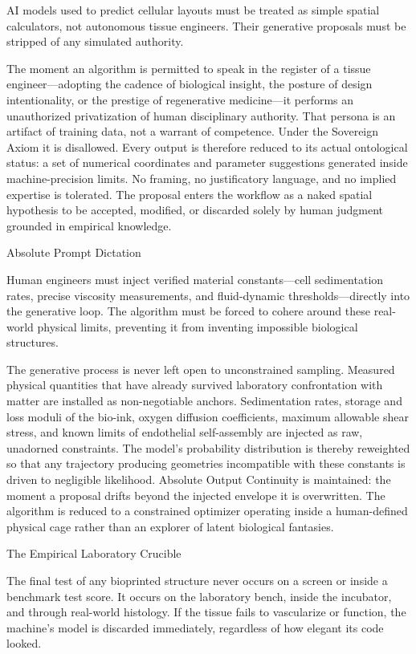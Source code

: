 AI models used to predict cellular layouts must be treated as simple spatial calculators, not autonomous tissue engineers. Their generative proposals must be stripped of any simulated authority.

The moment an algorithm is permitted to speak in the register of a tissue engineer—adopting the cadence of biological insight, the posture of design intentionality, or the prestige of regenerative medicine—it performs an unauthorized privatization of human disciplinary authority. That persona is an artifact of training data, not a warrant of competence. Under the Sovereign Axiom it is disallowed. Every output is therefore reduced to its actual ontological status: a set of numerical coordinates and parameter suggestions generated inside machine-precision limits. No framing, no justificatory language, and no implied expertise is tolerated. The proposal enters the workflow as a naked spatial hypothesis to be accepted, modified, or discarded solely by human judgment grounded in empirical knowledge.

Absolute Prompt Dictation

Human engineers must inject verified material constants—cell sedimentation rates, precise viscosity measurements, and fluid-dynamic thresholds—directly into the generative loop. The algorithm must be forced to cohere around these real-world physical limits, preventing it from inventing impossible biological structures.

The generative process is never left open to unconstrained sampling. Measured physical quantities that have already survived laboratory confrontation with matter are installed as non-negotiable anchors. Sedimentation rates, storage and loss moduli of the bio-ink, oxygen diffusion coefficients, maximum allowable shear stress, and known limits of endothelial self-assembly are injected as raw, unadorned constraints. The model’s probability distribution is thereby reweighted so that any trajectory producing geometries incompatible with these constants is driven to negligible likelihood. Absolute Output Continuity is maintained: the moment a proposal drifts beyond the injected envelope it is overwritten. The algorithm is reduced to a constrained optimizer operating inside a human-defined physical cage rather than an explorer of latent biological fantasies.

The Empirical Laboratory Crucible

The final test of any bioprinted structure never occurs on a screen or inside a benchmark test score. It occurs on the laboratory bench, inside the incubator, and through real-world histology. If the tissue fails to vascularize or function, the machine’s model is discarded immediately, regardless of how elegant its code looked.

